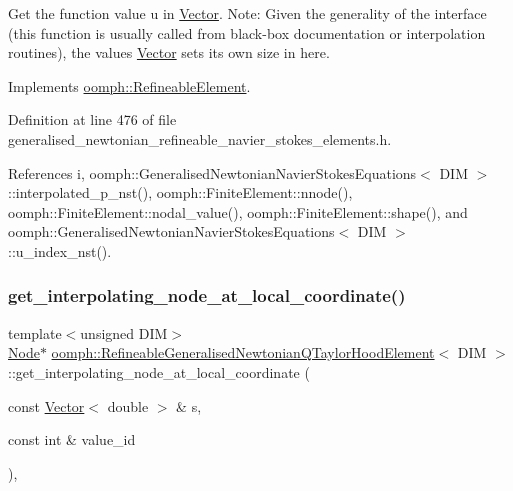 Get the function value u in \hyperlink{classoomph_1_1Vector}{Vector}. Note\+: Given the generality of the interface (this function is usually called from black-\/box documentation or interpolation routines), the values \hyperlink{classoomph_1_1Vector}{Vector} sets its own size in here. 



Implements \hyperlink{classoomph_1_1RefineableElement_ada6f0efe831ffefb1d2829ce01d45bfc}{oomph\+::\+Refineable\+Element}.



Definition at line 476 of file generalised\+\_\+newtonian\+\_\+refineable\+\_\+navier\+\_\+stokes\+\_\+elements.\+h.



References i, oomph\+::\+Generalised\+Newtonian\+Navier\+Stokes\+Equations$<$ D\+I\+M $>$\+::interpolated\+\_\+p\+\_\+nst(), oomph\+::\+Finite\+Element\+::nnode(), oomph\+::\+Finite\+Element\+::nodal\+\_\+value(), oomph\+::\+Finite\+Element\+::shape(), and oomph\+::\+Generalised\+Newtonian\+Navier\+Stokes\+Equations$<$ D\+I\+M $>$\+::u\+\_\+index\+\_\+nst().

\mbox{\label{classoomph_1_1RefineableGeneralisedNewtonianQTaylorHoodElement_a0766216e91d89a8459e650b6b5a72f2c}} 
\subsubsection{\texorpdfstring{get\+\_\+interpolating\+\_\+node\+\_\+at\+\_\+local\+\_\+coordinate()}{get\_interpolating\_node\_at\_local\_coordinate()}}
{\footnotesize\ttfamily template$<$unsigned D\+IM$>$ \\
\hyperlink{classoomph_1_1Node}{Node}$\ast$ \hyperlink{classoomph_1_1RefineableGeneralisedNewtonianQTaylorHoodElement}{oomph\+::\+Refineable\+Generalised\+Newtonian\+Q\+Taylor\+Hood\+Element}$<$ D\+IM $>$\+::get\+\_\+interpolating\+\_\+node\+\_\+at\+\_\+local\+\_\+coordinate (\begin{DoxyParamCaption}\item[{const \hyperlink{classoomph_1_1Vector}{Vector}$<$ double $>$ \&}]{s,  }\item[{const int \&}]{value\+\_\+id }\end{DoxyParamCaption})\hspace{0.3cm}{\ttfamily [inline]}, {\ttfamily [virtual]}}



